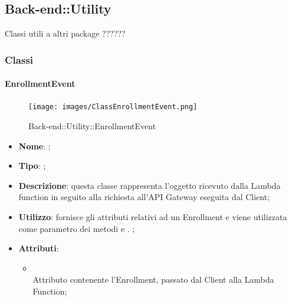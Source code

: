 \subsection{Back-end::Utility}
Classi utili a altri package ??????
\subsubsection{Classi}
\hypertarget{EnrollmentEvent_label}{\paragraph{EnrollmentEvent}}
\begin{figure}[h]
	\centering
	\texttt{[image: images/ClassEnrollmentEvent.png]}
	\caption{Back-end::Utility::EnrollmentEvent}
\end{figure}
\begin{itemize}
	\item \textbf{Nome}: ;
	\item \textbf{Tipo}: ;
	\item \textbf{Descrizione}: questa classe rappresenta l'oggetto ricevuto dalla Lambda function in seguito alla richiesta all'API Gateway eseguita dal Client;
	\item \textbf{Utilizzo}: fornisce gli attributi relativi ad un Enrollment e viene utilizzata come parametro dei metodi  e . ;
	\item \textbf{Attributi}:
	\begin{itemize}
		\item[]  \\
		Attributo contenente l'Enrollment, passato dal Client alla Lambda Function;
	\end{itemize}
\end{itemize}

